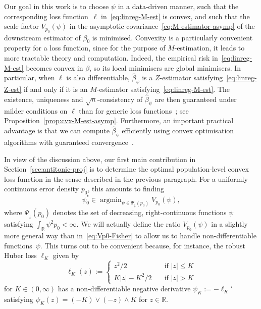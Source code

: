 \documentclass[a4paper]{article}
\newcommand{\R}{\mathbb{R}}
\DeclareMathOperator*{\argmin}{argmin}
\theoremstyle{definition}
\begin{document}
Our goal in this work is to choose $\psi$ in a data-driven manner, such that the corresponding loss function~$\ell$ in~\eqref{eq:linreg-M-est} is convex, and such that the scale factor $V_{p_0}(\psi)$ in the asymptotic covariance~\eqref{eq:M-estimator-asymp} of the downstream estimator of $\beta_0$ is minimised.  Convexity is a particularly convenient property for a loss function, since for the purpose of $M$-estimation, it leads to more tractable theory and computation.  Indeed, the empirical risk in~\eqref{eq:linreg-M-est} becomes convex in $\beta$, so its local minimisers are global minimisers. In particular, when $\ell$ is also differentiable, $\hat{\beta}_\psi$ is a $Z$-estimator satisfying~\eqref{eq:linreg-Z-est} if and only if it is an $M$-estimator satisfying~\eqref{eq:linreg-M-est}. The existence, uniqueness and $\sqrt{n}$-consistency of $\hat{\beta}_\psi$ are then guaranteed under milder conditions on $\ell$ than for generic loss functions~\citep{yohai1979asymptotic,maronna1981asymptotic,portnoy1985asymptotic,mammen1989asymptotics,arcones1998asymptotic,he2000parameters}; see Proposition~\ref{prop:cvx-M-est-asymp}. Furthermore, an important practical advantage is that we can compute $\hat{\beta}_\psi$ efficiently using convex optimisation algorithms with guaranteed convergence~\citep[Chapter~9]{boyd2004convex}.

In view of the discussion above, our first main contribution in Section~\ref{sec:antitonic-proj} is to determine the optimal population-level convex loss function in the sense described in the previous paragraph.  For a uniformly continuous error density $p_0$, this amounts to finding
\begin{equation}
\label{eq:Vp0-minimiser}
\psi_0^* \in \argmin_{\psi \in \Psi_\downarrow(p_0)} V_{p_0}(\psi),
\end{equation}
where $\Psi_\downarrow(p_0)$ denotes the set of decreasing, right-continuous functions $\psi$ satisfying $\int_{\mathbb{R}} \psi^2 p_0 < \infty$. We will actually define the ratio $V_{p_0}(\psi)$ in a slightly more general way than in~\eqref{eq:Vp0-Fisher} to allow us to handle non-differentiable functions~$\psi$.  This turns out to be convenient because, for instance, the robust Huber loss $\ell_K$ given by
\begin{equation}
\label{eq:huber-loss}
\ell_K(z) :=
\begin{cases}
z^2/2 \quad &\text{if }|z| \leq K\\
K|z| - K^2/2 \quad &\text{if }|z| > K
\end{cases}
\end{equation}
for $K \in (0,\infty)$ has a non-differentiable negative derivative $\psi_K := -\ell_K'$ satisfying $\psi_K(z) = (-K) \vee (-z) \wedge K$ for $z \in \R$. 
\end{document}
